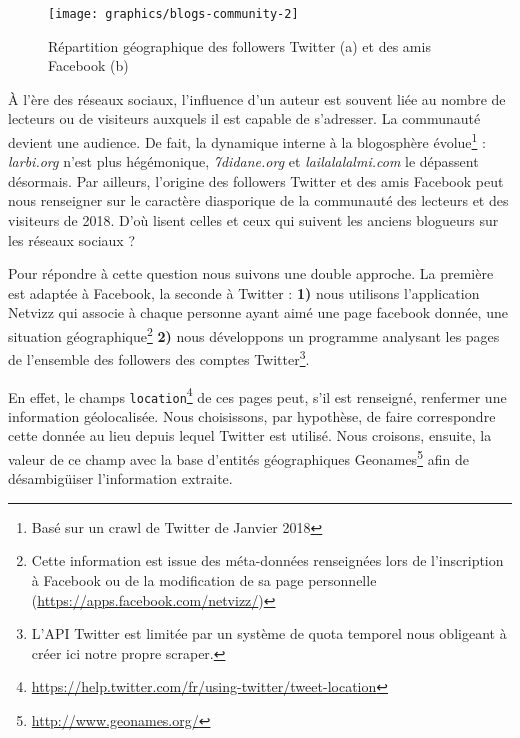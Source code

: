 \documentclass[symmetric,justified,marginals=raggedouter]{tufte-book}
\begin{document}
\begin{figure*}
  \texttt{[image: graphics/blogs-community-2]}
  \caption{Répartition géographique des followers Twitter (a) et des amis Facebook (b)}
  \label{fig:blogs-community}
\end{figure*} 

\noindent À l'ère des réseaux sociaux, l'influence d'un auteur est souvent liée au nombre de lecteurs ou de visiteurs auxquels il est capable de s'adresser. La communauté devient une audience. De fait, la dynamique interne à la blogosphère évolue\footnote{\RaggedOuter Basé sur un crawl de Twitter de Janvier 2018} : \textit{larbi.org} n'est plus hégémonique, \textit{7didane.org} et \textit{lailalalalmi.com} le dépassent désormais. Par ailleurs, l'origine des followers Twitter et des amis Facebook peut nous renseigner sur le caractère diasporique de la communauté des lecteurs et des visiteurs de 2018. D'où lisent celles et ceux qui suivent les anciens blogueurs sur les réseaux sociaux ?

Pour répondre à cette question nous suivons une double approche. La première est adaptée à Facebook, la seconde à Twitter : \textbf{1)} nous utilisons l'application Netvizz qui associe à chaque personne ayant aimé une page facebook donnée, une situation géographique\footnote{\RaggedOuter Cette information est issue des méta-données renseignées lors de l'inscription à Facebook ou de la modification de sa page personnelle (\url{https://apps.facebook.com/netvizz/})} \textbf{2)} nous développons un programme analysant les pages de l'ensemble des followers des comptes Twitter\footnote{\RaggedOuter L'API Twitter est limitée par un système de quota temporel nous obligeant à créer ici notre propre scraper.}. 

En effet, le champs \texttt{location}\footnote{\RaggedOuter \url{https://help.twitter.com/fr/using-twitter/tweet-location}} de ces pages peut, s'il est renseigné, renfermer une information géolocalisée. Nous choisissons, par hypothèse, de faire correspondre cette donnée au lieu depuis lequel Twitter est utilisé. Nous croisons, ensuite, la valeur de ce champ avec la base d'entités géographiques Geonames\footnote{\RaggedOuter \url{http://www.geonames.org/}} afin de désambigüiser l'information extraite. 
\end{document}
